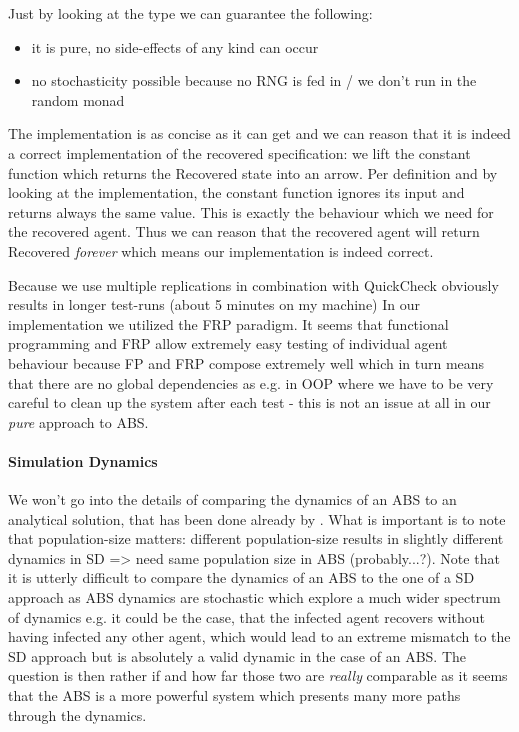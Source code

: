 Just by looking at the type we can guarantee the following:
\begin{itemize}
	\item it is pure, no side-effects of any kind can occur
	\item no stochasticity possible because no RNG is fed in / we don't run in the random monad
\end{itemize}

The implementation is as concise as it can get and we can reason that it is indeed a correct implementation of the recovered specification: we lift the constant function which returns the Recovered state into an arrow. Per definition and by looking at the implementation, the constant function ignores its input and returns always the same value. This is exactly the behaviour which we need for the recovered agent. Thus we can reason that the recovered agent will return Recovered \textit{forever} which means our implementation is indeed correct.

Because we use multiple replications in combination with QuickCheck obviously results in longer test-runs (about 5 minutes on my machine) In our implementation we utilized the FRP paradigm. It seems that functional programming and FRP allow extremely easy testing of individual agent behaviour because FP and FRP compose extremely well which in turn means that there are no global dependencies as e.g. in OOP where we have to be very careful to clean up the system after each test - this is not an issue at all in our \textit{pure} approach to ABS.

\paragraph{Simulation Dynamics}
We won't go into the details of comparing the dynamics of an ABS to an analytical solution, that has been done already by \cite{macal_agent-based_2010}. What is important is to note that population-size matters: different population-size results in slightly different dynamics in SD => need same population size in ABS (probably...?). Note that it is utterly difficult to compare the dynamics of an ABS to the one of a SD approach as ABS dynamics are stochastic which explore a much wider spectrum of dynamics e.g. it could be the case, that the infected agent recovers without having infected any other agent, which would lead to an extreme mismatch to the SD approach but is absolutely a valid dynamic in the case of an ABS. The question is then rather if and how far those two are \textit{really} comparable as it seems that the ABS is a more powerful system which presents many more paths through the dynamics.

